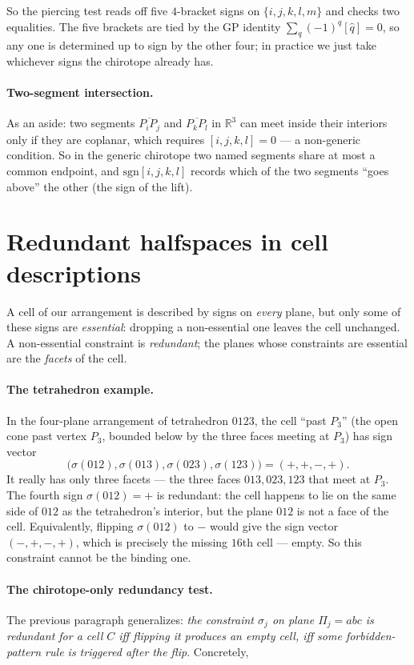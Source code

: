 \documentclass[11pt]{article}
\begin{document}
So the piercing test reads off five $4$-bracket signs on $\{i,j,k,l,m\}$ and
checks two equalities. The five brackets are tied by the GP identity
$\sum_q (-1)^q [\widehat q] = 0$, so any one is determined up to sign by the
other four; in practice we just take whichever signs the chirotope already
has.

\paragraph{Two-segment intersection.} As an aside: two segments
$\overline{P_iP_j}$ and $\overline{P_kP_l}$ in $\mathbb{R}^3$ can meet inside
their interiors only if they are coplanar, which requires $[i,j,k,l] = 0$
--- a non-generic condition. So in the generic chirotope two named segments
share at most a common endpoint, and $\mathrm{sgn}[i,j,k,l]$ records which
of the two segments ``goes above'' the other (the sign of the lift).

\section*{Redundant halfspaces in cell descriptions}

A cell of our arrangement is described by signs on \emph{every} plane, but
only some of these signs are \emph{essential}: dropping a non-essential one
leaves the cell unchanged. A non-essential constraint is \emph{redundant};
the planes whose constraints are essential are the \emph{facets} of the
cell.

\paragraph{The tetrahedron example.} In the four-plane arrangement of
tetrahedron $0123$, the cell ``past $P_3$'' (the open cone past vertex
$P_3$, bounded below by the three faces meeting at $P_3$) has sign vector
\[
  \bigl(\sigma(012),\sigma(013),\sigma(023),\sigma(123)\bigr) = (+,+,-,+).
\]
It really has only three facets --- the three faces $013, 023, 123$ that
meet at $P_3$. The fourth sign $\sigma(012) = +$ is redundant: the cell
happens to lie on the same side of $012$ as the tetrahedron's interior,
but the plane $012$ is not a face of the cell. Equivalently, flipping
$\sigma(012)$ to $-$ would give the sign vector $(-,+,-,+)$, which is
precisely the missing $16$th cell --- empty. So this constraint cannot be
the binding one.

\paragraph{The chirotope-only redundancy test.} The previous paragraph
generalizes: \emph{the constraint $\sigma_j$ on plane $\Pi_j = abc$ is
redundant for a cell $C$ iff flipping it produces an empty cell, iff some
forbidden-pattern rule is triggered after the flip}. Concretely,
\end{document}
